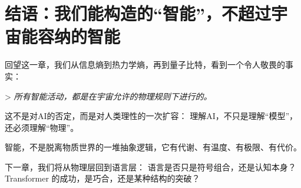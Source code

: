 \section*{结语：我们能构造的“智能”，不超过宇宙能容纳的智能}

回望这一章，我们从信息熵到热力学熵，再到量子比特，看到一个令人敬畏的事实：

> \textit{所有智能活动，都是在宇宙允许的物理规则下进行的。}

这不是对AI的否定，而是对人类理性的一次扩容：  
理解AI，不只是理解“模型”，还必须理解“物理”。

智能，不是脱离物质世界的一堆抽象逻辑，它有代谢、有温度、有极限、有代价。

下一章，我们将从物理层回到语言层：  
语言是否只是符号组合，还是认知本身？Transformer 的成功，是巧合，还是某种结构的突破？


\nocite{*}
\printbibliography[heading=bibintoc, title=\ebibname]

\newpage
